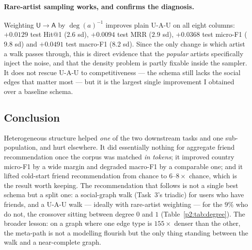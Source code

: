 \paragraph{Rare-artist sampling works, and confirms the diagnosis.}
Weighting $\mathsf{U}\to\mathsf{A}$ by $\deg(a)^{-1}$ improves plain \textsf{U-A-U} on all
eight columns: $+0.0129$ test Hit@1 ($2.6$ sd), $+0.0094$ test MRR ($2.9$ sd), $+0.0368$
test micro-F1 ($9.8$ sd) and $+0.0491$ test macro-F1 ($8.2$ sd).  Since the only change is
which artist a walk passes through, this is direct evidence that the \emph{popular} artists
specifically inject the noise, and that the density problem is partly fixable inside the
sampler.  It does not rescue \textsf{U-A-U} to competitiveness --- the schema still lacks
the social edges that matter most --- but it is the largest single improvement I obtained
over a baseline schema.

\subsection{Conclusion}
\label{p2:sec:conclusion}

Heterogeneous structure helped \emph{one} of the two downstream tasks and one
sub-population, and hurt elsewhere.  It did essentially nothing for aggregate friend
recommendation once the corpus was matched \emph{in tokens}; it improved country micro-F1
by a wide margin and degraded macro-F1 by a comparable one; and it lifted cold-start friend
recommendation from chance to $6$--$8\times$ chance, which is the result worth keeping.  The
recommendation that follows is not a single best schema but a split one: a social-graph walk
(Task~3's triadic) for users who have friends, and a \textsf{U-A-U} walk --- ideally with
rare-artist weighting --- for the $9\%$ who do not, the crossover sitting between degree $0$
and $1$ (Table~\ref{p2:tab:degree}).  The broader lesson: on a graph where one edge type is
$155\times$ denser than the other, the meta-path is not a modelling flourish but the only
thing standing between the walk and a near-complete graph.
